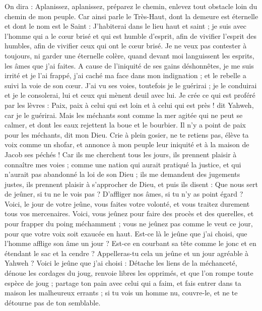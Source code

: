 \begin{multicols}{2}
On dira : Aplanissez, aplanissez, préparez le chemin, enlevez tout obstacle loin du chemin de mon peuple.
Car ainsi parle le Très-Haut, dont la demeure est éternelle et dont le nom est le Saint : J'habiterai dans le lieu haut et saint ; je suis avec l'homme qui a le cœur brisé et qui est humble d'esprit, afin de vivifier l'esprit des humbles, afin de vivifier ceux qui ont le cœur brisé.
Je ne veux pas contester à toujours, ni garder une éternelle colère, quand devant moi languissent les esprits, les âmes que j'ai faites.
A cause de l'iniquité de ses gains déshonnêtes, je me suis irrité et je l'ai frappé, j'ai caché ma face dans mon indignation ; et le rebelle a suivi la voie de son cœur.
J'ai vu ses voies, toutefois je le guérirai ; je le conduirai et je le consolerai, lui et ceux qui mènent deuil avec lui.
Je crée ce qui est proféré par les lèvres : Paix, paix à celui qui est loin et à celui qui est près ! dit Yahweh, car je le guérirai.
Mais les méchants sont comme la mer agitée qui ne peut se calmer, et dont les eaux rejettent la boue et le bourbier.
Il n'y a point de paix pour les méchants, dit mon Dieu.
\VerseOne{}Crie à plein gosier, ne te retiens pas, élève ta voix comme un shofar, et annonce à mon peuple leur iniquité et à la maison de Jacob ses péchés !
Car ils me cherchent tous les jours, ils prennent plaisir à connaître mes voies ; comme une nation qui aurait pratiqué la justice, et qui n'aurait pas abandonné la loi de son Dieu ; ils me demandent des jugements justes, ils prennent plaisir à s'approcher de Dieu, et puis ils disent :
Que nous sert de jeûner, si tu ne le vois pas ? D'affliger nos âmes, si tu n'y as point égard ? Voici, le jour de votre jeûne, vous faites votre volonté, et vous traitez durement tous vos mercenaires.
Voici, vous jeûnez pour faire des procès et des querelles, et pour frapper du poing méchamment ; vous ne jeûnez pas comme le veut ce jour, pour que votre voix soit exaucée en haut.
Est-ce là le jeûne que j'ai choisi, que l'homme afflige son âme un jour ? Est-ce en courbant sa tête comme le jonc et en étendant le sac et la cendre ? Appelleras-tu cela un jeûne et un jour agréable à Yahweh ?
Voici le jeûne que j'ai choisi : Détache les liens de la méchanceté, dénoue les cordages du joug, renvoie libres les opprimés, et que l'on rompe toute espèce de joug ;
partage ton pain avec celui qui a faim, et fais entrer dans ta maison les malheureux errants ; si tu vois un homme nu, couvre-le, et ne te détourne pas de ton semblable.

\end{multicols}
